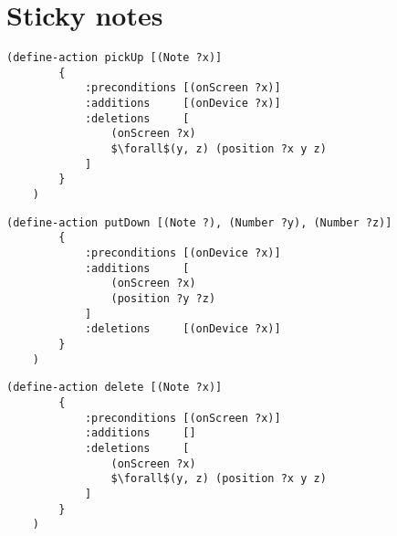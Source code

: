\section{Sticky notes}

\begin{lstlisting}[caption=pickUp,mathescape=true]
    (define-action pickUp [(Note ?x)]
        {
            :preconditions [(onScreen ?x)]
            :additions     [(onDevice ?x)]
            :deletions     [
                (onScreen ?x)
                $\forall$(y, z) (position ?x y z)
            ]
        }
    )
\end{lstlisting}

\begin{lstlisting}[caption=putDown]
    (define-action putDown [(Note ?), (Number ?y), (Number ?z)]
        {
            :preconditions [(onDevice ?x)]
            :additions     [
                (onScreen ?x)
                (position ?y ?z)
            ]
            :deletions     [(onDevice ?x)]
        }
    )
\end{lstlisting}

\begin{lstlisting}[caption=delete,mathescape=true]
    (define-action delete [(Note ?x)]
        {
            :preconditions [(onScreen ?x)]
            :additions     []
            :deletions     [
                (onScreen ?x)
                $\forall$(y, z) (position ?x y z)
            ]
        }
    )
\end{lstlisting}